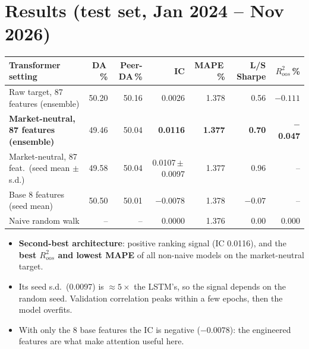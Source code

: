 \documentclass[10pt,a4paper]{article}
\begin{document}
\section{Results (test set, Jan 2024 -- Nov 2026)}
\begin{center}\footnotesize\setlength\tabcolsep{4pt}
\begin{tabular}{lrrrrrr}
\toprule
Transformer setting & DA\,\% & Peer-DA\,\% & IC & MAPE\,\% & L/S Sharpe & $R^2_{oos}$\,\%\\\midrule
Raw target, 87 features (ensemble) & 50.20 & 50.16 & 0.0026 & 1.378 & 0.56 & $-0.111$\\
\textbf{Market-neutral, 87 features (ensemble)} & 49.46 & 50.04 & \textbf{0.0116} & \textbf{1.377} & \textbf{0.70} & \textbf{$-$0.047}\\
Market-neutral, 87 feat.\ (seed mean $\pm$ s.d.) & 49.58 & 50.04 & 0.0107\,$\pm$\,0.0097 & 1.377 & 0.96 & --\\
Base 8 features (seed mean) & 50.50 & 50.01 & $-0.0078$ & 1.378 & $-0.07$ & --\\
Naive random walk & -- & -- & 0.0000 & 1.376 & 0.00 & 0.000\\\bottomrule
\end{tabular}
\end{center}
\begin{itemize}
  \item \textbf{Second-best architecture}: positive ranking signal (IC 0.0116), and the \textbf{best $R^2_{oos}$ and lowest MAPE} of all non-naive models on the market-neutral target.
  \item Its seed s.d.\ (0.0097) is $\approx5\times$ the LSTM's, so the signal depends on the random seed. Validation correlation peaks within a few epochs, then the model overfits.
  \item With only the 8 base features the IC is negative ($-0.0078$): the engineered features are what make attention useful here.
\end{itemize}
\end{document}
